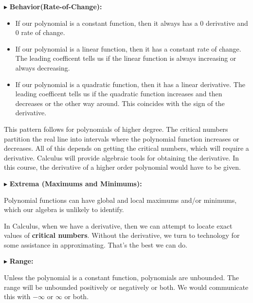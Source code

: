 \documentclass{ximera}
\begin{document}
$\blacktriangleright$ \textbf{\textcolor{red!10!blue!90!}{Behavior(Rate-of-Change):}} 


\begin{itemize}

\item If our polynomial is a constant function, then it always has a $0$ derivative and $0$ rate of change.


\item If our polynomial is a linear function, then it has a constant rate of change. The leading coefficent tells us if the linear function is always increasing or always decreasing.


\item If our polynomial is a quadratic function, then it has a linear derivative. The leading coefficent tells us if the quadratic function increases and then decreases or the other way around.  This coincides with the sign of the derivative.

\end{itemize}

This pattern follows for polynomials of higher degree. The critical numbers partition the real line into intervals where the polynomial function increases or decreases.  All of this depends on getting the critical numbers, which will require a derivative.  Calculus will provide algebraic tools for obtaining the derivative. In this course, the derivative of a higher order polynomial would have to be given.










$\blacktriangleright$  \textbf{\textcolor{red!10!blue!90!}{Extrema (Maximums and Minimums):}} 


Polynomial functions can have global and local maximums and/or minimums, which our algebra is unlikely to identify. 

 In Calculus, when we have a derivative, then we can attempt to locate exact values of \textbf{critical numbers}.  Without the derivative, we turn to technology for some assistance in approximating.  That's the best we can do.






$\blacktriangleright$  \textbf{\textcolor{red!10!blue!90!}{Range:}} 


Unless the polynomial is a constant function, polynomials are unbounded.  The range will be unbounded positively or negatively or both.  We would communicate this with $-\infty$ or $\infty$ or both.  
\end{document}
